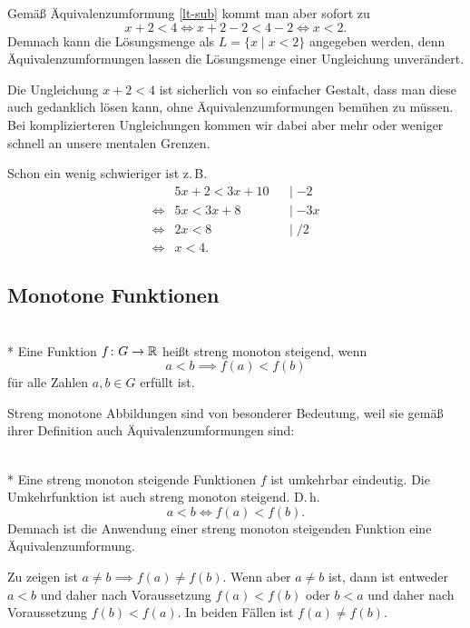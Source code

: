Gemäß Äquivalenzumformung \eqref{lt-sub} kommt man aber sofort zu
\[x+2<4 \iff x+2-2<4-2 \iff x<2.\]
Demnach kann die Lösungsmenge als $L=\{x\mid x<2\}$ angegeben werden,
denn Äquivalenzumformungen lassen die Lösungsmenge einer Ungleichung
unverändert.

Die Ungleichung $x+2<4$ ist sicherlich von so einfacher Gestalt,
dass man diese auch gedanklich lösen kann, ohne Äquivalenzumformungen
bemühen zu müssen. Bei komplizierteren Ungleichungen kommen wir dabei
aber mehr oder weniger schnell an unsere mentalen Grenzen.

Schon ein wenig schwieriger ist z.\,B.
\begin{align*}
& 5x+2<3x+10 && |\;{-2}\\
\iff & 5x<3x+8 && |\;{-3x}\\
\iff & 2x<8 && |\;{/2}\\
\iff & x<4.
\end{align*}

\subsection{Monotone Funktionen}%

\begin{Definition}%
%
\mbox{}\\*
Eine Funktion $f\colon G\to\mathbb R$ heißt streng monoton steigend, wenn
\[a<b\implies f(a)<f(b)\]
für alle Zahlen $a,b\in G$ erfüllt ist.
\end{Definition}
Streng monotone Abbildungen sind von besonderer Bedeutung, weil
sie gemäß ihrer Definition auch Äquivalenzumformungen sind:

\begin{Satz}%
%
\mbox{}\\*
Eine streng monoton steigende Funktionen $f$ ist umkehrbar eindeutig.
Die Umkehrfunktion ist auch streng monoton steigend. D.\,h.
\[a<b\iff f(a)<f(b).\]
Demnach ist die Anwendung einer streng monoton steigenden
Funktion eine Äquivalenzumformung.
\end{Satz}
\noindent{}
Zu zeigen ist $a\ne b\implies f(a)\ne f(b)$. Wenn aber $a\ne b$
ist, dann ist entweder $a<b$ und daher nach Voraussetzung
$f(a)<f(b)$ oder $b<a$ und daher nach Voraussetzung $f(b)<f(a)$.
In beiden Fällen ist $f(a)\ne f(b)$.

